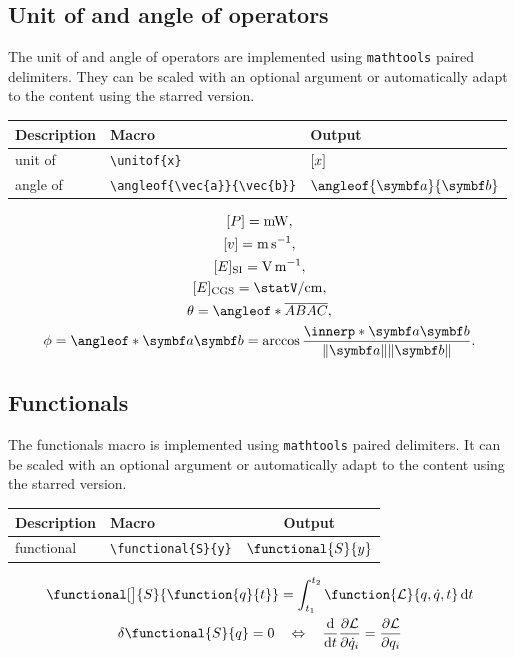 \documentclass[DIV=13]{scrartcl}
\begin{document}
\subsection{Unit of and angle of operators}
The unit of and angle of operators are implemented using \texttt{mathtools}
paired delimiters. They can be scaled with an optional argument or
automatically adapt to the content using the starred version.
\begin{center}
  \begin{tabular}{lll}
    \toprule
    \textbf{Description} & \textbf{Macro}
                         & \textbf{Output}                   \\
    \midrule
    unit of              & \verb|\unitof{x}|
                         & $\lbrack x\rbrack$                      \\
    angle of             & \verb|\angleof{\vec{a}}{\vec{b}}|
                         & $\angleof{\vec{a}}{\vec{b}}$      \\
    \bottomrule
  \end{tabular}
\end{center}
\begin{gather}
  \unitof{P} = \si{\milli\watt}, \\
  \unitof{v} = \si{\meter\per\second}, \\
  \unitof{E}_\mathrm{SI} = \si{\volt\per\meter}, \\
  \unitof{E}_\mathrm{CGS} = \si{\statV\per\centi\meter}, \\
  \theta = \angleof*{\overline{AB}}{\overline{AC}}, \\
  \phi = \angleof*{\vec{a}}{\vec{b}}
  = \arccos\frac{\innerp*{\vec{a}}{\vec{b}}}{\norm*{\vec{a}}\norm*{\vec{b}}}.
\end{gather}


\subsection{Functionals}
The functionals macro is implemented using \texttt{mathtools} paired
delimiters. It can be scaled with an optional argument or automatically adapt
to the content using the starred version.
\begin{center}
  \begin{tabular}{llc}
    \toprule
    \textbf{Description} & \textbf{Macro}           & \textbf{Output}     \\
    \midrule
    functional           & \verb|\functional{S}{y}| & $\functional{S}{y}$ \\
    \bottomrule
  \end{tabular}
\end{center}
\begin{gather}
  \functional[\big]{S}{\function{q}{t}} = \int_{t_1}^{t_2}
  \function{\mathcal{L}}{q,\dot{q},t} \diff t \\
  \delta \functional{S}{q} = 0 \quad\lequiv\quad
  \dd{}{t}\pdd{\mathcal{L}}{\dot{q}_i} = \pdd{\mathcal{L}}{q_i}
\end{gather}
\end{document}
